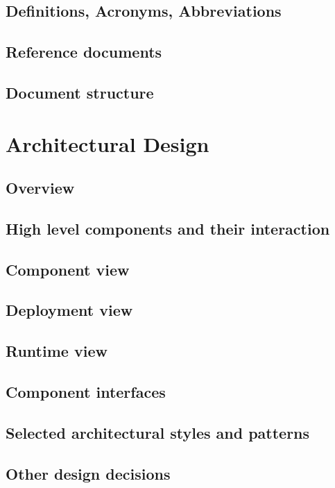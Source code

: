 \documentclass[18pt,oneside,a4paper, titlepage]{article}
\begin{document}
		\subsection{Definitions, Acronyms, Abbreviations}
		\subsection{Reference documents}
		\subsection{Document structure}
		
	\section{Architectural Design}
		\subsection{Overview}
		\subsection{High level components and their interaction}
		\subsection{Component view}
		\subsection{Deployment view}
		\subsection{Runtime view}
		
		\subsection{Component interfaces}
		\subsection{Selected architectural styles and patterns}
			
		\subsection{Other design decisions}
		
\end{document}
